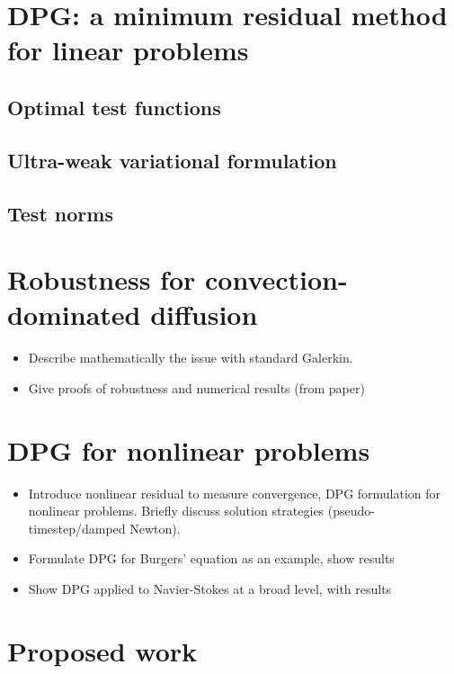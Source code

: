 \documentclass{article}
\begin{document}
\section{DPG: a minimum residual method for linear problems}

\subsection{Optimal test functions}

\subsection{Ultra-weak variational formulation}

\subsection{Test norms}

\section{Robustness for convection-dominated diffusion}

\begin{itemize}
\item Describe mathematically the issue with standard Galerkin.
\item Give proofs of robustness and numerical results (from paper)
\end{itemize}

\section{DPG for nonlinear problems}

\begin{itemize}
\item Introduce nonlinear residual to measure convergence, DPG formulation for nonlinear problems. Briefly discuss solution strategies (pseudo-timestep/damped Newton). 
\item Formulate DPG for Burgers' equation as an example, show results
\item Show DPG applied to Navier-Stokes at a broad level, with results
\end{itemize}

\section{Proposed work}
\end{document}
